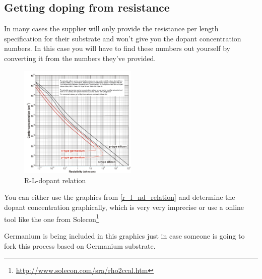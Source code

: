 \subsection{Getting doping from resistance}
In many cases the supplier will only provide the resistance per length specification for their substrate and won't give you the dopant concentration numbers.
In this case you will have to find these numbers out yourself by converting it from the numbers they've provided.

\begin{figure}[H]
	\centering
	\includegraphics[width=0.5\textwidth]{resistance_doping.png}
	\caption{R-L-dopant relation}
	\label{r_l_nd_relation}
\end{figure}

You can either use the graphics from \autoref{r_l_nd_relation} and determine the dopant concentration graphically, which is very very imprecise or use a online tool like the one from Solecon\footnote{\url{http://www.solecon.com/sra/rho2ccal.htm}}

Germanium is being included in this graphics just in case someone is going to fork this process based on Germanium substrate.